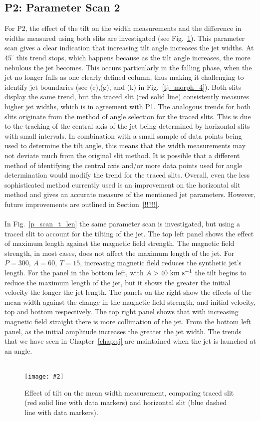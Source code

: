 \documentclass[12pt]{ociamthesis}
\newcommand{\mfig}[4]{
  \begin{figure}
  \begin{center}
  \texttt{[image: \#2]}
  \caption{#3}
  \label{#4}
  \end{center}
  \end{figure}}
\newcommand{\kms}{~\rm{km ~s^{-1}}}
\newcommand{\np}{\\ \\}
\begin{document}
\subsection{P2: Parameter Scan 2}
\label{subsec:pscansII_II}
For P2, the effect of the tilt on the width measurements and the difference in widths measured using both slits are investigated (see Fig.~\ref{width_measure}). This parameter scan gives a clear indication that increasing tilt angle increases the jet widths. At $45^{\circ}$ this trend stops, which happens because as the tilt angle increases, the more nebulous the jet becomes. This occurs particularly in the falling phase, when the jet no longer falls as one clearly defined column, thus making it challenging to identify jet boundaries (see (c),(g), and (k) in Fig.~\ref{tj_morph_4}). Both slits display the same trend, but the traced slit (red solid line) consistently measures higher jet widths, which is in agreement with P1. The analogous trends for both slits originate from the method of angle selection for the traced slits. This is due to the tracking of the central axis of the jet being determined by horizontal slits with small intervals. In combination with a small sample of data points being used to determine the tilt angle, this means that the width measurements may not deviate much from the original slit method. It is possible that a different method of identifying the central axis and/or more data points used for angle determination would modify the trend for the traced slits. Overall, even the less sophisticated method currently used is an improvement on the horizontal slit method and gives an accurate measure of the mentioned jet parameters. However, future improvements are outlined in Section~\ref{!!?!!}. \np
%
In Fig.~\ref{p_scan_t_len} the same parameter scan is investigated, but using a traced slit to account for the tilting of the jet. The top left panel shows the effect of maximum length against the magnetic field strength. The magnetic field strength, in most cases, does not affect the maximum length of the jet. For $P=300,~A=60,~T=15$, increasing magnetic field reduces the synthetic jet's length. For the panel in the bottom left, with $A>40 \kms$ the tilt begins to reduce the maximum length of the jet, but it shows the greater the initial velocity the longer the jet length. The panels on the right show the effects of the mean width against the change in the magnetic field strength, and initial velocity, top and bottom respectively. The top right panel shows that with increasing magnetic field straight there is more collimation of the jet. From the bottom left panel, as the initial amplitude increases the greater the jet width. The trends that we have seen in Chapter~\ref{chap:sj} are maintained when the jet is launched at an angle.  \np
\mfig{1}{figures/mean_w_vs_tilt.png}{Effect of tilt on the mean width measurement, comparing traced slit (red solid line with data markers) and horizontal slit (blue dashed line with data markers).}{width_measure}
\end{document}
